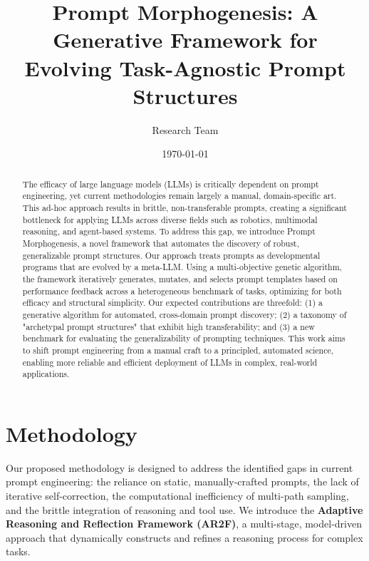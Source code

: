 \documentclass{article}
\begin{document}
\title{Prompt Morphogenesis: A Generative Framework for Evolving Task-Agnostic Prompt Structures}
\author{Research Team}
\date{\today}

\maketitle

\begin{abstract}
The efficacy of large language models (LLMs) is critically dependent on prompt engineering, yet current methodologies remain largely a manual, domain-specific art. This ad-hoc approach results in brittle, non-transferable prompts, creating a significant bottleneck for applying LLMs across diverse fields such as robotics, multimodal reasoning, and agent-based systems. To address this gap, we introduce Prompt Morphogenesis, a novel framework that automates the discovery of robust, generalizable prompt structures. Our approach treats prompts as developmental programs that are evolved by a meta-LLM. Using a multi-objective genetic algorithm, the framework iteratively generates, mutates, and selects prompt templates based on performance feedback across a heterogeneous benchmark of tasks, optimizing for both efficacy and structural simplicity. Our expected contributions are threefold: (1) a generative algorithm for automated, cross-domain prompt discovery; (2) a taxonomy of "archetypal prompt structures" that exhibit high transferability; and (3) a new benchmark for evaluating the generalizability of prompting techniques. This work aims to shift prompt engineering from a manual craft to a principled, automated science, enabling more reliable and efficient deployment of LLMs in complex, real-world applications.
\end{abstract}

\section{Methodology}
\label{sec:methodology}

Our proposed methodology is designed to address the identified gaps in current prompt engineering: the reliance on static, manually-crafted prompts, the lack of iterative self-correction, the computational inefficiency of multi-path sampling, and the brittle integration of reasoning and tool use. We introduce the \textbf{Adaptive Reasoning and Reflection Framework (AR2F)}, a multi-stage, model-driven approach that dynamically constructs and refines a reasoning process for complex tasks.
\end{document}
